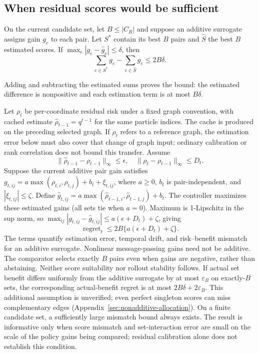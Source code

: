 \subsection{When residual scores would be sufficient}
\begin{proposition}
On the current candidate set, let $B\le |C_R|$ and suppose an additive surrogate assigns gain $g_e$ to each pair. Let $S^*$ contain its best $B$ pairs and $\widehat S$ the best $B$ estimated scores. If $\max_e|g_e-\widehat g_e|\le\delta$, then
\begin{equation}
 \sum_{e\in S^*}g_e-\sum_{e\in\widehat S}g_e\le2B\delta.
 \label{eq:regret}
\end{equation}
\end{proposition}
Adding and subtracting the estimated sums proves the bound: the estimated difference is nonpositive and each estimation term is at most $B\delta$.

Let $\rho_t$ be per-coordinate residual risk under a fixed graph convention, with cached estimate $\widehat\rho_{t-1}=q^{t-1}$ for the same particle indices. The cache is produced on the preceding selected graph. If $\rho_t$ refers to a reference graph, the estimation error below must also cover that change of graph input; ordinary calibration or rank correlation does not bound this transfer. Assume
\begin{equation}
 \|\widehat\rho_{t-1}-\rho_{t-1}\|_\infty\le\epsilon,
 \quad \|\rho_t-\rho_{t-1}\|_\infty\le D_t.
\end{equation}
Suppose the current additive pair gain satisfies
$g_{t,ij}=a\max(\rho_{t,i},\rho_{t,j})+b_t+\xi_{t,ij}$,
where $a\ge0$, $b_t$ is pair-independent, and $|\xi_{t,ij}|\le\zeta$. Define $\widehat g_{t,ij}=a\max(\widehat\rho_{t-1,i},\widehat\rho_{t-1,j})+b_t$. The controller maximizes these estimated gains (all sets tie when $a=0$). Maximum is 1-Lipschitz in the sup norm, so $\max_{ij}|g_{t,ij}-\widehat g_{t,ij}|\le a(\epsilon+D_t)+\zeta$, giving
\begin{equation}
 \operatorname{regret}_t\le 2B\{a(\epsilon+D_t)+\zeta\}.
\end{equation}
The terms quantify estimation error, temporal drift, and risk--benefit mismatch for an additive surrogate. Nonlinear message-passing gains need not be additive. The comparator selects exactly $B$ pairs even when gains are negative, rather than abstaining. Neither score suitability nor rollout stability follows.
If actual set benefit differs uniformly from the additive surrogate by at most $\varepsilon_B$ on exactly-$B$ sets, the corresponding actual-benefit regret is at most $2B\delta+2\varepsilon_B$. This additional assumption is unverified; even perfect singleton scores can miss complementary edges (Appendix~\ref{sec:nonadditive-allocation}).
On a finite candidate set, a sufficiently large mismatch bound always exists. The result is informative only when score mismatch and set-interaction error are small on the scale of the policy gains being compared; residual calibration alone does not establish this condition.

